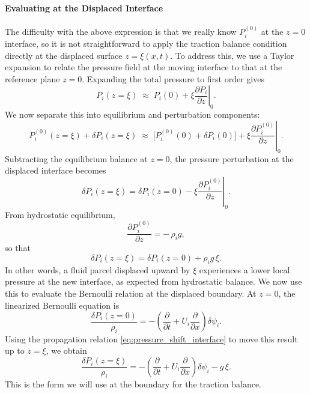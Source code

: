 \paragraph{Evaluating at the Displaced Interface}
The difficulty with the above expression is that we really know $P_i^{(0)}$ at the $z=0$ interface, 
so it is not straightforward to apply the traction balance condition directly at the displaced surface $z=\xi(x,t)$.  
To address this, we use a Taylor expansion to relate the pressure field at the moving interface to that at the reference plane $z=0$. Expanding the total pressure to first order gives
\[
P_i(z=\xi) \;\approx\; P_i(0) + \xi \left.\frac{\partial P_i}{\partial z}\right|_{0}.
\]
We now separate this into equilibrium and perturbation components:
\[
P_i^{(0)}(z=\xi) + \delta P_i(z=\xi)
\;\approx\;
\big[ P_i^{(0)}(0) + \delta P_i(0) \big]
+ \xi \left.\frac{\partial P_i^{(0)}}{\partial z}\right|_{0}.
\]
Subtracting the equilibrium balance at $z=0$, the pressure perturbation at the displaced interface becomes
\begin{equation}
\label{eq:pressure_expansion_displaced}
\delta P_i(z=\xi) = \delta P_i(z=0) - \xi \left.\frac{\partial P_i^{(0)}}{\partial z}\right|_{0}.
\end{equation}
From hydrostatic equilibrium,
\[
\frac{\partial P_i^{(0)}}{\partial z} = -\,\rho_i g,
\]
so that
\begin{equation}
\label{eq:pressure_shift_interface}
\delta P_i(z=\xi) = \delta P_i(z=0) + \rho_i g\,\xi.
\end{equation}
In other words, a fluid parcel displaced upward by $\xi$ experiences a lower local pressure at the new interface, as expected from hydrostatic balance. We now use this to evaluate the Bernoulli relation at the displaced boundary. At $z=0$, the linearized Bernoulli equation is
\[
\frac{\delta P_i(z=0)}{\rho_i}
= -\left(\frac{\partial}{\partial t} + U_i\frac{\partial}{\partial x}\right)\delta\psi_i.
\]
Using the propagation relation \eqref{eq:pressure_shift_interface} to move this result up to $z=\xi$, we obtain
\[
\frac{\delta P_i(z=\xi)}{\rho_i}
= -\left(\frac{\partial}{\partial t} + U_i\frac{\partial}{\partial x}\right)\delta\psi_i
- g\,\xi.
\]
This is the form we will use at the boundary for the traction balance.

